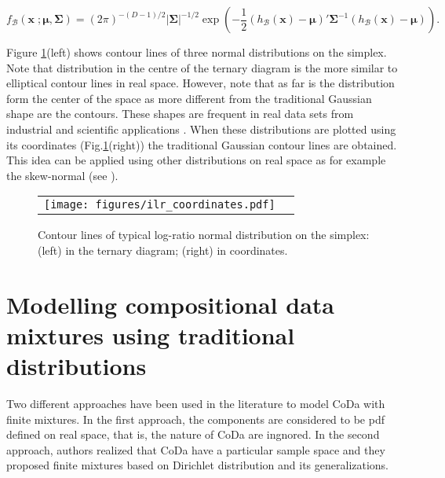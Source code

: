 \documentclass[12pt, a4paper]{article}
\newcommand{\m}[1]{\boldsymbol{#1}}
\begin{document}
\begin{equation}\label{eq:densSNormal}
f_\mathcal{B}(\mathbf{x}\;; \m\mu, \m\Sigma) =(2\pi)^{-(D-1)/2} |\mathbf{\Sigma}|^{-1/2} \exp \left( -{\frac{1}{2}} \left(h_\mathcal{B}(\textbf{x})- \m\mu \right)' \mathbf{\Sigma}^{-1} \left( h_\mathcal{B}(\textbf{x})- \m\mu \right)\right).
\end{equation}

Figure \ref{fig01}(left) shows  contour lines of three normal distributions on the simplex. Note that distribution in the centre of the ternary diagram is the more similar to elliptical contour lines in real space. However, note that as far is
the distribution form the center of the space as more different from the traditional Gaussian shape are the contours. These shapes are frequent in real data sets from industrial and scientific applications \citep{buccianti2011natural,vives2014individual}.
When these distributions are plotted using its coordinates (Fig.\ref{fig01}(right)) the traditional Gaussian contour lines are obtained. This idea can be applied using other distributions on real space as for example the skew-normal (see \cite{mateu2007skew}).


\begin{figure}[thbp]
\begin{center}
\begin{tabular}{cc}
  \texttt{[image: figures/ilr\_coordinates.pdf]} \\
 \end{tabular}
 \caption{Contour lines of typical log-ratio normal distribution on the simplex: (left) in the ternary diagram; (right) in coordinates. }\label{fig01}
\end{center}
\end{figure}



\section{Modelling compositional data mixtures using traditional distributions}
\label{standard_section}

\noindent Two different approaches have been used in the literature to model CoDa with finite mixtures. 
In the first approach,  the components are considered to be pdf defined on real space, that is, the nature of CoDa are ingnored. In the second approach,  authors realized that CoDa have a particular sample space and they proposed finite mixtures based on Dirichlet distribution and its generalizations.
\end{document}
